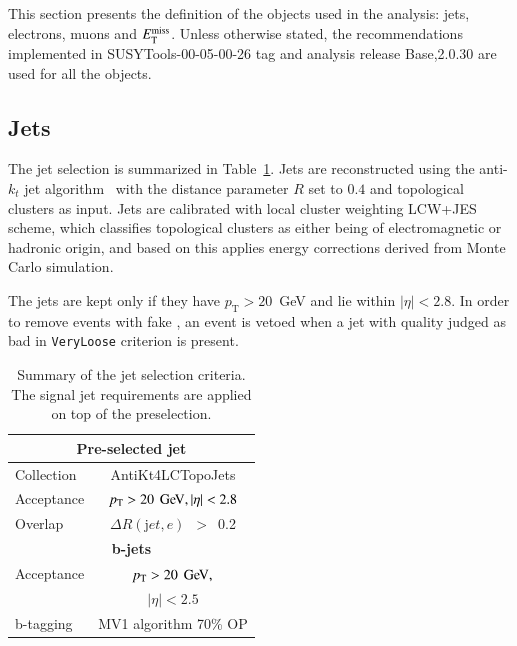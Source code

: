 This section presents the definition of the objects used in the analysis: jets, electrons, muons and $E_{\mathrm{T}}^{\mathrm{miss}}$. 
Unless otherwise stated, the recommendations implemented in SUSYTools-00-05-00-26 tag and analysis release Base,2.0.30 
are used for all the objects.

\subsection{Jets}
\label{sec:objects_jets}

The jet selection is summarized in Table~\ref{tab:jetsdef}. Jets are reconstructed using the anti-$k_{t}$ jet algorithm~\cite{Cacciari:2008gp} with the distance parameter $R$ 
set to $0.4$ and topological clusters as input. Jets are calibrated with local cluster weighting LCW+JES scheme, which classifies topological clusters as either being of electromagnetic or hadronic origin, and based on this applies energy corrections derived from Monte Carlo simulation. 

The jets are kept only if they have $p_\mathrm{T}>20$~GeV and lie within $|\eta|<2.8$. 
In order to remove events with fake \met, an event is vetoed when a jet with quality judged as bad in {\tt VeryLoose} criterion is present.


\begin{table}[htb!]
\caption{Summary of the jet selection criteria. The signal jet requirements are applied on top of the preselection.}
\label{tab:jetsdef}
\begin{center}
    \begin{tabular}{|l|c|}
      \hline
      \hline
      \multicolumn{2}{|c|}{\textbf{Pre-selected jet}}\\
    \hline
      \hline
      Collection     & AntiKt4LCTopoJets \\
      \hline
      Acceptance     & $\pt > 20\,\GeV, |\eta | < 2.8$ \\
      \hline
      Overlap        & $\Delta{}R({\mathrm jet},e)$~$>$~0.2 \\
      \hline\hline
      \multicolumn{2}{|c|}{\textbf{b-jets}}\\
    \hline
      \hline
     Acceptance     & $\pt > 20\,\GeV,$ \\
      & $|\eta | < 2.5$ \\ 
      \hline
     b-tagging  &  MV1 algorithm 70\% OP\\
      \hline
\end{tabular}
\end{center}
\end{table}


